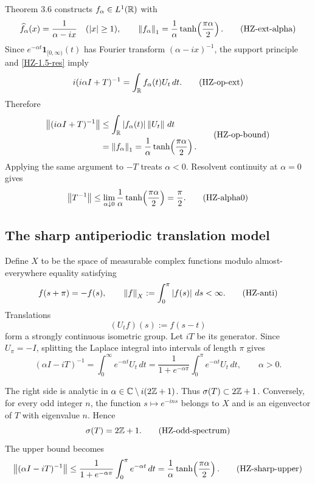Theorem 3.6 constructs $f_\alpha\in L^1(\mathbb{R})$ with
\[
  \widehat f_\alpha(x)=\frac{1}{\alpha-ix}
  \quad(|x|\ge1),
  \qquad
  \left\lVert f_\alpha\right\rVert_1
  =\frac1\alpha\tanh\!\left(\frac{\pi\alpha}{2}\right).
  \tag{HZ-ext-alpha}\label{HZ-ext-alpha}
\]
Since $e^{-\alpha t}\mathbf1_{[0,\infty)}(t)$ has Fourier transform $(\alpha-ix)^{-1}$, the support principle and \eqref{HZ-1.5-res} imply
\[
  i(i\alpha I+T)^{-1}
  =\int_{\mathbb{R}}f_\alpha(t)U_t\,dt.
  \tag{HZ-op-ext}\label{HZ-op-ext}
\]
Therefore
\[
\begin{aligned}
  \left\lVert (i\alpha I+T)^{-1}\right\rVert
  &\le \int_{\mathbb{R}}\left\lvert f_\alpha(t)\right\rvert\left\lVert U_t\right\rVert\,dt\\
  &=\left\lVert f_\alpha\right\rVert_1
   =\frac1\alpha\tanh\!\left(\frac{\pi\alpha}{2}\right).
\end{aligned}
\tag{HZ-op-bound}\label{HZ-op-bound}
\]
Applying the same argument to $-T$ treats $\alpha<0$. Resolvent continuity at $\alpha=0$ gives
\[
  \left\lVert T^{-1}\right\rVert
  \le\lim_{\alpha\downarrow0}
      \frac1\alpha\tanh\!\left(\frac{\pi\alpha}{2}\right)
  =\frac\pi2.
  \tag{HZ-alpha0}\label{HZ-alpha0}
\]

\subsection{The sharp antiperiodic translation model}

Define $X$ to be the space of measurable complex functions modulo almost-everywhere equality satisfying
\[
  f(s+\pi)=-f(s),
  \qquad
  \left\lVert f\right\rVert_X:=\int_0^\pi\left\lvert f(s)\right\rvert\,ds<\infty.
  \tag{HZ-anti}\label{HZ-anti}
\]
Translations
\[
  (U_tf)(s):=f(s-t)
  \tag{HZ-shift}\label{HZ-shift}
\]
form a strongly continuous isometric group. Let $iT$ be its generator. Since $U_\pi=-I$, splitting the Laplace integral into intervals of length $\pi$ gives
\[
  (\alpha I-iT)^{-1}
  =\int_0^\infty e^{-\alpha t}U_t\,dt
  =\frac{1}{1+e^{-\alpha\pi}}
     \int_0^\pi e^{-\alpha t}U_t\,dt,
  \qquad\alpha>0.
  \tag{HZ-periodic-res}\label{HZ-periodic-res}
\]

The right side is analytic in $\alpha\in\mathbb{C}\setminus i(2\mathbb{Z}+1)$. Thus $\sigma(T)\subset2\mathbb{Z}+1$. Conversely, for every odd integer $n$, the function $s\mapsto e^{-ins}$ belongs to $X$ and is an eigenvector of $T$ with eigenvalue $n$. Hence
\[
  \sigma(T)=2\mathbb{Z}+1.
  \tag{HZ-odd-spectrum}\label{HZ-odd-spectrum}
\]
The upper bound becomes
\[
  \left\lVert (\alpha I-iT)^{-1}\right\rVert
  \le \frac{1}{1+e^{-\alpha\pi}}
      \int_0^\pi e^{-\alpha t}\,dt
  =\frac1\alpha\tanh\!\left(\frac{\pi\alpha}{2}\right).
  \tag{HZ-sharp-upper}\label{HZ-sharp-upper}
\]

